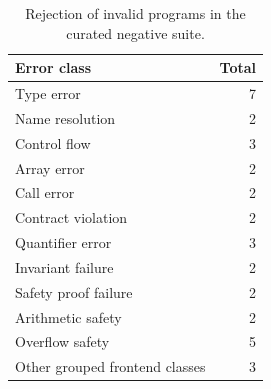 \begin{table}[h]
  \centering
  \small
  \begin{tabular}{l r}
    \hline
    \textbf{Error class}           & \textbf{Total} \\
    \hline
    Type error                     & 7              \\
    Name resolution                & 2              \\
    Control flow                   & 3              \\
    Array error                    & 2              \\
    Call error                     & 2              \\
    Contract violation             & 2              \\
    Quantifier error               & 3              \\
    Invariant failure              & 2              \\
    Safety proof failure           & 2              \\
    Arithmetic safety              & 2              \\
    Overflow safety                & 5              \\
    Other grouped frontend classes & 3              \\
    \hline
  \end{tabular}
  \caption{Rejection of invalid programs in the curated negative suite.}
  \label{tab:negative-suite-summary}
\end{table}

